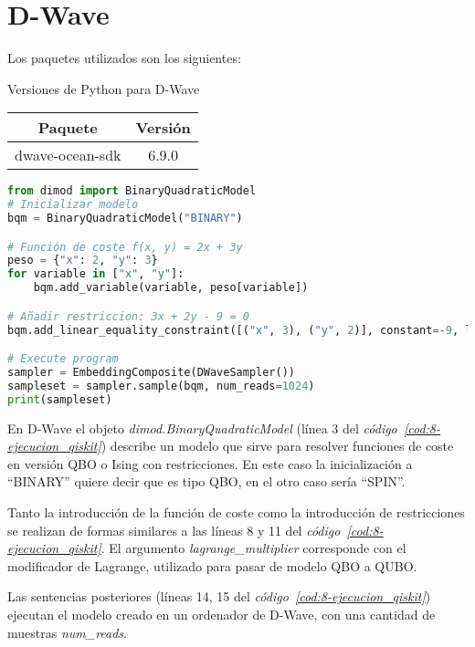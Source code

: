 \section{D-Wave}

Los paquetes utilizados son los siguientes:

\begin{table}{}{Versiones de Python para D-Wave}
  \centering
  \begin{tabular}{|c|c|}
    \hline
    \textbf{Paquete} & \textbf{Versión} \\ \hline
    dwave-ocean-sdk  & 6.9.0            \\
    \hline
  \end{tabular}
\end{table}

\begin{lstlisting}[language=Python,label=cod:8-ejecucion_qiskit,caption={Ejemplo de ejecución en simulador de Qiskit},style=numbered]
from dimod import BinaryQuadraticModel
# Inicializar modelo
bqm = BinaryQuadraticModel("BINARY")

# Función de coste f(x, y) = 2x + 3y
peso = {"x": 2, "y": 3}
for variable in ["x", "y"]:
    bqm.add_variable(variable, peso[variable])

# Añadir restriccion: 3x + 2y - 9 = 0
bqm.add_linear_equality_constraint([("x", 3), ("y", 2)], constant=-9, lagrange_multiplier=P)

# Execute program
sampler = EmbeddingComposite(DWaveSampler())
sampleset = sampler.sample(bqm, num_reads=1024)
print(sampleset)
\end{lstlisting}

En D-Wave el objeto \textit{dimod.BinaryQuadraticModel} (línea 3 del \textit{código~\ref{cod:8-ejecucion_qiskit}}) describe un modelo que sirve para resolver funciones de coste en versión QBO o Ising con restricciones.
En este caso la inicialización a ``BINARY'' quiere decir que es tipo QBO, en el otro caso sería ``SPIN''.

Tanto la introducción de la función de coste como la introducción de restricciones se realizan de formas similares a las líneas 8 y 11 del \textit{código~\ref{cod:8-ejecucion_qiskit}}.
El argumento \textit{lagrange\_multiplier} corresponde con el modificador de Lagrange, utilizado para pasar de modelo QBO a QUBO\@.

Las sentencias posteriores (líneas 14, 15 del \textit{código~\ref{cod:8-ejecucion_qiskit}}) ejecutan el modelo creado en un ordenador de D-Wave, con una cantidad de muestras \textit{num\_reads}.


